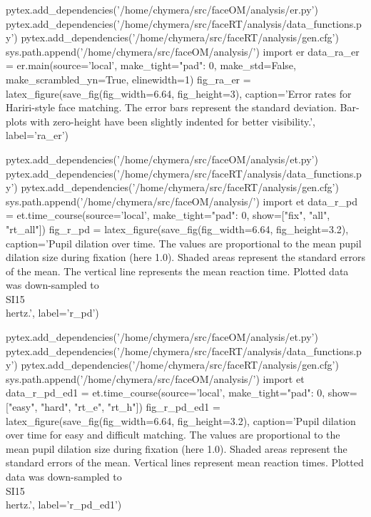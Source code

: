 \begin{pycode}[ra_er]
pytex.add_dependencies('/home/chymera/src/faceOM/analysis/er.py')
pytex.add_dependencies('/home/chymera/src/faceRT/analysis/data_functions.py')
pytex.add_dependencies('/home/chymera/src/faceRT/analysis/gen.cfg')
sys.path.append('/home/chymera/src/faceOM/analysis/')
import er
data_ra_er = er.main(source='local', make_tight={"pad": 0}, make_std=False, make_scrambled_yn=True, elinewidth=1)
fig_ra_er = latex_figure(save_fig(fig_width=6.64, fig_height=3), caption='Error rates for Hariri-style face matching. The error bars represent the standard deviation. Bar-plots with zero-height have been slightly indented for better visibility.', label='ra_er')
\end{pycode}
\begin{pycode}[r_pd]
pytex.add_dependencies('/home/chymera/src/faceOM/analysis/et.py')
pytex.add_dependencies('/home/chymera/src/faceRT/analysis/data_functions.py')
pytex.add_dependencies('/home/chymera/src/faceRT/analysis/gen.cfg')
sys.path.append('/home/chymera/src/faceOM/analysis/')
import et
data_r_pd = et.time_course(source='local', make_tight={"pad": 0}, show=["fix", "all", "rt_all"])
fig_r_pd = latex_figure(save_fig(fig_width=6.64, fig_height=3.2), caption='Pupil dilation over time. The values are proportional to the mean pupil dilation size during fixation (here 1.0). Shaded areas represent the standard errors of the mean. The vertical line represents the mean reaction time. Plotted data was down-sampled to \\SI{15}{\\hertz}.', label='r_pd')
\end{pycode}
\begin{pycode}[r_pd_ed1]
pytex.add_dependencies('/home/chymera/src/faceOM/analysis/et.py')
pytex.add_dependencies('/home/chymera/src/faceRT/analysis/data_functions.py')
pytex.add_dependencies('/home/chymera/src/faceRT/analysis/gen.cfg')
sys.path.append('/home/chymera/src/faceOM/analysis/')
import et
data_r_pd_ed1 = et.time_course(source='local', make_tight={"pad": 0}, show=["easy", "hard", "rt_e", "rt_h"])
fig_r_pd_ed1 = latex_figure(save_fig(fig_width=6.64, fig_height=3.2), caption='Pupil dilation over time for easy and difficult matching. The values are proportional to the mean pupil dilation size during fixation (here 1.0). Shaded areas represent the standard errors of the mean. Vertical lines represent mean reaction times. Plotted data was down-sampled to \\SI{15}{\\hertz}.', label='r_pd_ed1')
\end{pycode}
